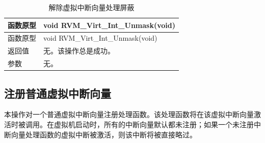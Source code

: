\begin{xltabular}{\textwidth}{@{}>{\hsize\raggedright\arraybackslash}X>{\hsize\raggedright\arraybackslash}X@{}}
\caption{解除虚拟中断向量处理屏蔽}\label{tab:4-22}\\
\toprule
函数原型 & void RVM\_\allowbreak{}Virt\_\allowbreak{}Int\_\allowbreak{}Unmask(void)\tabularnewline
\endfirsthead
\toprule
函数原型 & void RVM\_\allowbreak{}Virt\_\allowbreak{}Int\_\allowbreak{}Unmask(void)\tabularnewline
\midrule
\endhead
\bottomrule
\endlastfoot
返回值 & 无。该操作总是成功。\tabularnewline
参数 & 无。\tabularnewline
\end{xltabular}

\subsection{注册普通虚拟中断向量}\label{subsec:4-5-5}

本操作对一个普通虚拟中断向量注册处理函数。该处理函数将在该虚拟中断向量激活时被调用。在虚拟机启动时，所有的中断向量默认都未注册；如果一个未注册中断向量处理函数的虚拟中断被激活，则该中断将被直接略过。

